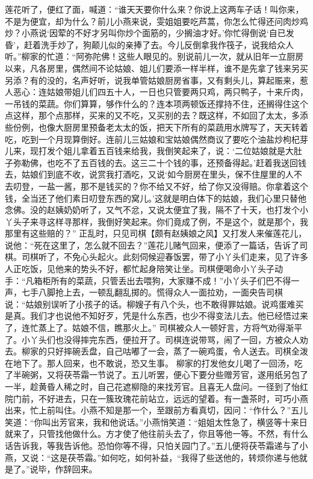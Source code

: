 \documentclass[12pt,oneside]{book}
\begin{document}
莲花听了，便红了面，喊道：“谁天天要你什么来？你说上这两车子话！叫你来，不是为便宜，却为什么？前儿小燕来说，雯姐姐要吃芦蒿，你怎么忙得还问肉炒鸡炒？小燕说‘因荤的不好才另叫你炒个面筋的，少搁油才好。’你忙得倒说‘自已发昏’，赶着洗手炒了，狗颠儿似的亲捧了去。今儿反倒拿我作筏子，说我给众人听。”柳家的忙道：“阿弥陀佛！这些人眼见的。别说前儿一次，就从旧年一立厨房以来，凡各房里，偶然间不论姑娘、姐儿们要添一样半样，谁不是先拿了钱来另买另添？有的没的，名声好听，说我单管姑娘厨房省事，又有剩头儿，算起赈来，惹人恶心：连姑娘带姐儿们四五十人，一日也只管要两只鸡，两只鸭子，十来斤肉，一吊钱的菜蔬。你们算算，够作什么的？连本项两顿饭还撑持不住，还搁得住这个点这样，那个点那样，买来的又不吃，又买别的去？既这样，不如回了太太，多添些份例，也像大厨房里预备老太太的饭，把天下所有的菜蔬用水牌写了，天天转着吃，吃到一个月现算倒好。连前儿三姑娘和宝姑娘偶然商议了要吃个油盐炒枸杞芽儿来，现打发个姐儿拿着五百钱来给我，我倒笑起来了，说：‘二位姑娘就是大肚子弥勒佛，也吃不了五百钱的去。这三二十个钱的事，还预备得起。’赶着我送回钱去，姑娘们到底不收，说赏我打酒吃，又说‘如今厨房在里头，保不住屋里的人不去叨登，一盐一酱，那不是钱买的？你不给又不好，给了你又没得赔。你拿着这个钱，全当还了他们素日叨登东西的窝儿。’这就是明白体下的姑娘，我们心里只替他念佛。没的赵姨奶奶听了，又气不忿，又说太便宜了我，隔不了十天，也打发个小丫头子来寻这样寻那样，我倒好笑起来。你们竟成了例，不是这个，就是那个，我那里有这些赔的？”
正乱时，只见司棋【颇有赵姨娘之风】又打发人来催莲花儿，说他：“死在这里了，怎么就不回去？”莲花儿赌气回来，便添了一篇话，告诉了司棋。司棋听了，不免心头起火。此刻伺候迎春饭罢，带了小丫头们走来，见了许多人正吃饭，见他来的势头不好，都忙起身陪笑让坐。司棋便喝命小丫头子动手：“凡箱柜所有的菜蔬，只管丢出去喂狗，大家赚不成！”小丫头子们巴不得一声，七手八脚抢上去，一顿乱翻乱掷的。慌得众人一面拉劝，一面央告司棋说：“姑娘别误听了小孩子的话。柳嫂子有八个头，也不敢得罪姑娘。说鸡蛋难买是真。我们才也说他不知好歹，凭是什么东西，也少不得变法儿去。他已经悟过来了，连忙蒸上了。姑娘不信，瞧那火上。”
司棋被众人一顿好言，方将气劝得渐平了。小丫头们也没得摔完东西，便拉开了。司棋连说带骂，闹了一回，方被众人劝去。柳家的只好摔碗丢盘，自己咕嘟了一会，蒸了一碗鸡蛋，令人送去。司棋全泼在地下了。那人回来，也不敢说，恐又生事。
柳家的打发他女儿喝了一回汤，吃了半碗粥，又将茯苓霜一节说了。五儿听罢，便心下要分些赠芳官，遂用纸另包了一半，趁黄昏人稀之时，自己花遮柳隐的来找芳官。且喜无人盘问。一径到了怡红院门前，不好进去，只在一簇玫瑰花前站立，远远的望着。有一盏茶时，可巧小燕出来，忙上前叫住。小燕不知是那一个，至跟前方看真切，因问：“作什么？”五儿笑道：“你叫出芳官来，我和他说话。”小燕悄笑道：“姐姐太性急了，横竖等十来日就来了，只管找他做什么。方才使了他往前头去了，你且等他一等。不然，有什么话告诉我，等我告诉他。恐怕你等不得，只怕关园门了。”五儿便将茯苓霜递与了小燕，又说：“这是茯苓霜。”如何吃，如何补益，“我得了些送他的，转烦你递与他就是了。”说毕，作辞回来。
\end{document}
